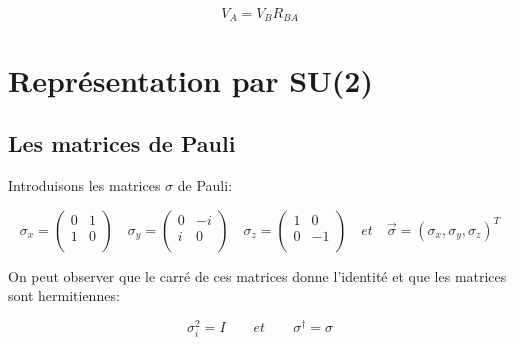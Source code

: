\documentclass[12pt,a4paper]{article}
\begin{document}
	\[
	\boxed{V_{A} = V_{B} R_{BA} }
	\]
	
	
\newpage
\section{Représentation par SU(2)}
	\subsection{Les matrices de Pauli}
	 Introduisons les matrices $\sigma$ de Pauli:
	
	\[
	\sigma_x=\begin{pmatrix}
	0&1\\
	1&0\\
	\end{pmatrix}\quad
	\sigma_y=\begin{pmatrix}
	0&-i\\
	i&0\\
	\end{pmatrix}\quad
	\sigma_z=\begin{pmatrix}
	1&0\\
	0&-1\\
	\end{pmatrix}\quad et\quad \vec{\sigma}=(\sigma_x,\sigma_y,\sigma_z)^T
	\]
	
	On peut observer que le carré de ces matrices donne l'identité et que les matrices sont hermitiennes:  
	
	\[
		\boxed{\sigma_i^2=I}\quad\quad et \quad\quad \boxed{\sigma^{\dagger}=\sigma}
	\]
	
\end{document}
